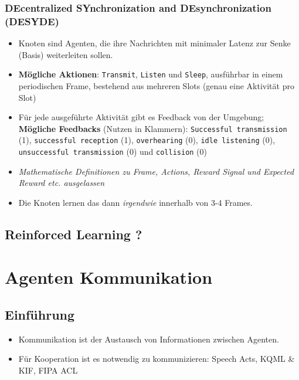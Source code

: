 \documentclass{article} %
\begin{document}
\subsubsection{DEcentralized SYnchronization and DEsynchronization (DESYDE)}
\begin{itemize}
	\item Knoten sind Agenten, die ihre Nachrichten mit minimaler Latenz zur Senke (Basis) weiterleiten sollen.
	\item \textbf{Mögliche Aktionen}: \texttt{Transmit}, \texttt{Listen} und \texttt{Sleep}, ausführbar in einem periodischen Frame, bestehend aus mehreren Slots (genau eine Aktivität pro Slot)
	\item Für jede ausgeführte Aktivität gibt es Feedback von der Umgebung; \textbf{Mögliche Feedbacks} (Nutzen in Klammern): \texttt{Successful transmission} (1), \texttt{successful reception} (1), \texttt{overhearing} (0), \texttt{idle listening} (0), \texttt{unsuccessful transmission} (0) und \texttt{collision} (0)
	\item \emph{Mathematische Definitionen zu Frame, Actions, Reward Signal und Expected Reward etc. ausgelassen}
	\item Die Knoten lernen das dann \emph{irgendwie} innerhalb von 3-4 Frames.
\end{itemize}
\subsection{Reinforced Learning ?}
\section{Agenten Kommunikation}
	\subsection{Einführung}
	\begin{itemize}
		\item Kommunikation ist der Austausch von Informationen zwischen Agenten.
		\item Für Kooperation ist es notwendig zu kommunizieren: Speech Acts, KQML \& KIF, FIPA ACL
	\end{itemize}
\end{document}
